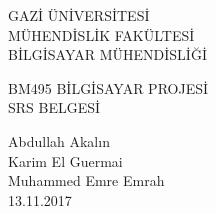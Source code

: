 \begin{titlepage}
   \begin{center}
      \begin{large}
         \vspace*{0.5cm}
         GAZİ ÜNİVERSİTESİ \\
         MÜHENDİSLİK FAKÜLTESİ \\
         BİLGİSAYAR MÜHENDİSLİĞİ

         \vfill
         BM495  BİLGİSAYAR PROJESİ \\
         SRS BELGESİ

         \vfill
         Abdullah Akalın\\Karim El Guermai\\Muhammed Emre Emrah\\

         \vfill
         \vspace{0.5cm}
         13.11.2017
      \end{large}
   \end{center}
\end{titlepage}
